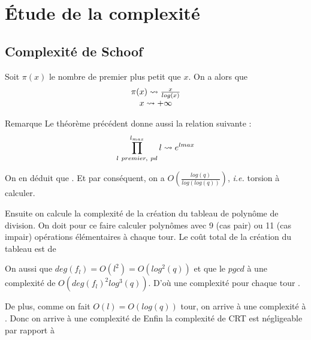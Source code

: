 \documentclass[french, lmodern]{beamer}
\newcommand\ie{\textit{i.e.}}
\begin{document}
\section{Étude de la complexité}
\subsection{Complexité de Schoof}

\begin{frame}
\transwipe
\begin{theorem}
Soit $\pi(x)$ le nombre de premier plus petit que $x$. On a alors que $$
\begin{array}{cl cl}
\pi(x)\leadsto\frac{x}{log(x)}\\
x \leadsto +\infty 
\end{array}$$
\end{theorem}
\pause

\begin{alertblock}{Remarque}
Le théorème précédent donne aussi la relation suivante :
$$\prod_{l\ premier,\ p\nshortmid l}^{l_{max}}l\leadsto e^{lmax}$$  
\end{alertblock}
\end{frame}

\begin{frame}
\transwipe
On en déduit que  . Et par conséquent, on a $O\left(\frac{log(q)}{log(log(q))}\right)$, \ie  {} torsion à calculer.
\newline
\pause

Ensuite on calcule la complexité de la création du tableau de polynôme de division.
On doit pour ce faire calculer  polynômes avec 9 (cas pair) ou 11 (cas impair) opérations élémentaires à chaque tour. Le coût total de la création du tableau est de 
\newline
\pause

On aussi que $deg(f_{l})=O(l^{2})=O(log^{2}(q))$ et que le $pgcd$ à une complexité de $O(deg(f_{l})^{2}log^{3}(q))$.
D'où une complexité pour chaque tour .
\newline
\pause

De plus, comme on fait $O(l)=O(log(q))$ tour, on arrive à une complexité à .
Donc on arrive à une complexité de 
Enfin la complexité de CRT est négligeable par rapport à 
\end{frame}
\end{document}
